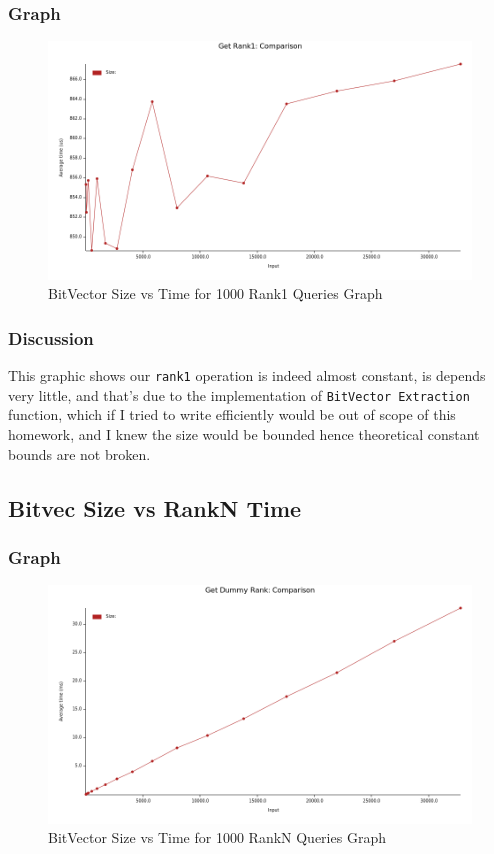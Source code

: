 \documentclass{report}
\begin{document}
\subsubsection*{Graph}
\begin{figure}[h!]
    \centering
    \includegraphics[scale=0.5]{get_rank1_time.png}
    \caption{BitVector Size vs Time for 1000 Rank1 Queries Graph}
    \label{fig:my_label}
\end{figure}
\subsubsection*{Discussion}
This graphic shows our \texttt{rank1} operation is indeed almost constant, is depends very little, and that's due to the implementation of \texttt{BitVector Extraction} function, which if I tried to write efficiently would be out of scope of this homework, and I knew the size would be bounded hence theoretical constant bounds are not broken. 
\newpage

\subsection*{Bitvec Size vs RankN Time}
\subsubsection*{Graph}
\begin{figure}[h!]
    \centering
    \includegraphics[scale=0.5]{get_dummy_rank_time.png}
    \caption{BitVector Size vs Time for 1000 RankN Queries Graph}
    \label{fig:my_label}
\end{figure}
\end{document}

